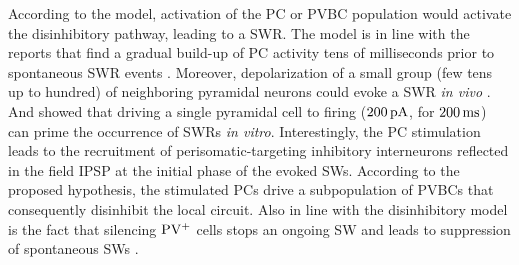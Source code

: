     According to the model, activation of the PC or PVBC population would
    activate the disinhibitory pathway, leading to a SWR. The model is in line
    with the reports that find a gradual build-up of PC activity tens of
    milliseconds prior to spontaneous SWR events \citep{Ellender2010,
    Schlingloff2014, Hulse2016}. Moreover, depolarization of a small group (few
    tens up to hundred) of neighboring pyramidal neurons could evoke a SWR
    \textit{in vivo} \citep{Stark2014}. And \cite{Bazelot2016} showed that
    driving a single pyramidal cell to firing ($200\, \rm pA$, for $200\, \rm
    ms$) can prime the occurrence of SWRs \textit{in vitro}. Interestingly, the
    PC stimulation leads to the recruitment of perisomatic-targeting inhibitory
    interneurons reflected in the field IPSP at the initial phase of the evoked
    SWs. According to the proposed hypothesis, the stimulated PCs
    \citep{Stark2014, Bazelot2016} drive a subpopulation of PVBCs that
    consequently disinhibit the local circuit. Also in line with the
    disinhibitory model is the fact that silencing $\rm PV^+$ cells stops an
    ongoing SW and leads to suppression of spontaneous SWs
    \citep{Schlingloff2014}.

